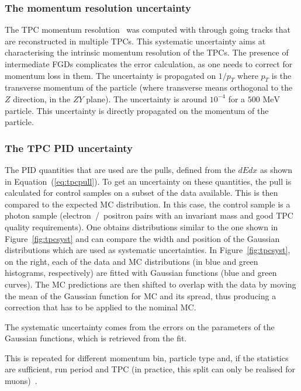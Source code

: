\subsubsection{The momentum resolution uncertainty}
\label{subsec:momresol}
The \Gls{TPC} momentum resolution~\cite{TN212} was computed with
through going tracks that are reconstructed in multiple
\Glspl{TPC}. This systematic uncertainty aims at characterising the
intrinsic momentum resolution of the \Glspl{TPC}. The presence of
intermediate \Glspl{FGD} complicates the error calculation, as one
needs to correct for momentum loss in them. The uncertainty is
propagated on $1 / p_T$ where $p_T$ is the transverse momentum of the
particle (where transverse means orthogonal to the $Z$ direction, in
the $ZY$ plane). The uncertainty is around $10^{-4}$ for a
$500\text{~MeV}$ particle. This uncertainty is directly propagated on
the momentum of the particle.

\subsubsection{The \Gls{TPC} \Gls{PID} uncertainty}
\label{subsec:tpcpid}
The \Gls{PID} quantities that are used are the pulls, defined from the
$dEdx$ as shown in Equation~(\ref{eq:tpcpull}). To get an uncertainty
on these quantities, the pull is calculated for control samples on a
subset of the data available. This is then compared to the expected
\Gls{MC} distribution. In this case, the control sample is a photon
sample (electron~/~positron pairs with an invariant mass and good
\Gls{TPC} quality requirements). One obtains distributions similar to
the one shown in Figure~\ref{fig:tpcsyst} and can compare the width
and position of the Gaussian distributions which are used as
systematic uncertainties. In Figure~\ref{fig:tpcsyst}, on the right,
each of the data and \Gls{MC} distributions (in blue and green
histograms, respectively) are fitted with Gaussian functions (blue and
green curves). The \Gls{MC} predictions are then shifted to overlap
with the data by moving the mean of the Gaussian function for \Gls{MC}
and its spread, thus producing a correction that has to be applied to
the nominal \Gls{MC}.

The systematic uncertainty comes from the errors on the parameters of
the Gaussian functions, which is retrieved from the fit.

This is repeated for different momentum bin, particle type and, if the
statistics are sufficient, run period and \Gls{TPC} (in practice, this
split can only be realised for muons)~\cite{TN212}.

